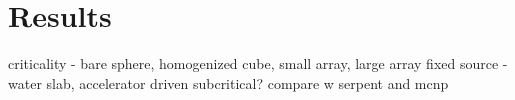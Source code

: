 \chapter{Results}
\label{chap:results}


criticality - bare sphere, homogenized cube,  small array, large array
fixed source - water slab, accelerator driven subcritical?
compare w serpent and mcnp